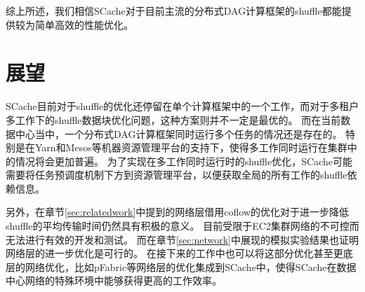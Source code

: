 综上所述，我们相信SCache对于目前主流的分布式DAG计算框架的shuffle都能提供较为简单高效的性能优化。

\section{展望}

SCache目前对于shuffle的优化还停留在单个计算框架中的一个工作，而对于多租户多工作下的shuffle数据块优化问题，这种方案则并不一定是最优的。
而在当前数据中心当中，一个分布式DAG计算框架同时运行多个任务的情况还是存在的。
特别是在Yarn\cite{yarn}和Mesos\cite{mesos}等机器资源管理平台的支持下，使得多工作同时运行在集群中的情况将会更加普遍。
为了实现在多工作同时运行时的shuffle优化，SCache可能需要将任务预调度机制下方到资源管理平台，以便获取全局的所有工作的shuffle依赖信息。

另外，在章节\ref{sec:relatedwork}中提到的网络层借用coflow的优化对于进一步降低shuffle的平均传输时间仍然具有积极的意义。
目前受限于EC2集群网络的不可控而无法进行有效的开发和测试。
而在章节\ref{sec:network}中展现的模拟实验结果也证明网络层的进一步优化是可行的。
在接下来的工作中也可以将这部分优化甚至更底层的网络优化，比如pFabric\cite{pfabric}等网络层的优化集成到SCache中，使得SCache在数据中心网络的特殊环境中能够获得更高的工作效率。


